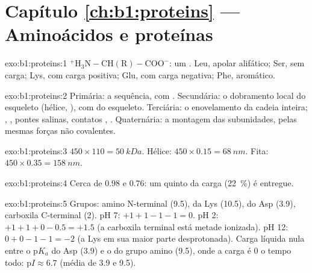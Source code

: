 \section*{Capítulo \ref{ch:b1:proteins} --- Aminoácidos e proteínas}

\begin{solution}{exo:b1:proteins:1}
$\mathrm{^+H_3N{-}CH(R){-}COO^-}$: um . Leu, apolar alifático;
Ser,  sem carga; Lys, com carga positiva; Glu, com carga negativa;
Phe, aromático.
\end{solution}

\begin{solution}{exo:b1:proteins:2}
Primária: a sequência, com . Secundária: o
dobramento local do esqueleto (hélice, ), com  do esqueleto. Terciária: o enovelamento da cadeia inteira;
, , pontes salinas, contatos , . Quaternária: a montagem das
subunidades, pelas mesmas forças não covalentes.
\end{solution}

\begin{solution}{exo:b1:proteins:3}
$450\times 110 = \qty{50}{kDa}$. Hélice: $450\times 0.15 = \qty{68}{nm}$.
Fita: $450\times 0.35 = \qty{158}{nm}$.
\end{solution}

\begin{solution}{exo:b1:proteins:4}
Cerca de $0.98$ e $0.76$: um quinto da carga (\qty{22}{\%}) é entregue.
\end{solution}

\begin{solution}{exo:b1:proteins:5}
Grupos: amino N-terminal (9.5),  da Lys (10.5),  do Asp (3.9), carboxila C-terminal (2). pH 7:
$+1 + 1 - 1 - 1 = 0$. pH 2: $+1 + 1 + 0 - 0.5 = +1.5$ (a carboxila
terminal está metade ionizada). pH 12: $0 + 0 - 1 - 1 = -2$ (a Lys em
sua maior parte desprotonada). Carga líquida nula entre o p$K_a$ do Asp
(3.9) e o do grupo amino (9.5), onde a carga é $0$ o tempo todo:
p$I \approx 6.7$ (média de 3.9 e 9.5).
\end{solution}

